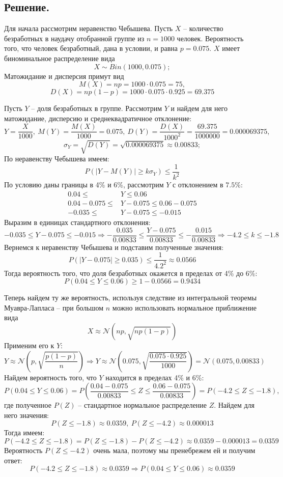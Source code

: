 \documentclass[a4paper, 12pt]{article}
\begin{document}
    \subsection{Решение.}
    Для начала рассмотрим неравенство Чебышева. Пусть $X$ -- количество безработных в наудачу отобранной
    группе из $n=1000$ человек. Вероятность того, что человек безработный, дана в условии, и равна $p=0.075$.
    $X$ имеет биноминальное распределение вида
    $$
    X\sim Bin(1000, 0.075);
    $$
    Матожидание и дисперсия примут вид
    $$
    M(X)=np=1000\cdot0.075=75,
    $$
    $$
    D(X)=np(1-p)=1000\cdot0.075\cdot0.925=69.375
    $$


    Пусть $Y$ -- доля безработных в группе. Рассмотрим $Y$ и найдем для него матожидание, дисперсию и
    среднеквадратичное отклонение:
    $$
    Y=\dfrac{X}{1000},\ M(Y)=\dfrac{M(X)}{1000}=0.075,\ D(Y)=\dfrac{D(X)}{1000^2}=\dfrac{69.375}{1000000}=0.000069375,
    $$
    $$
    \sigma_{Y}=\sqrt{D(Y)}=\sqrt{0.000069375}\approx 0.00833;
    $$
    По неравенству Чебышева имеем:
    $$
    P(|Y-M(Y)|\geq k\sigma_{Y})\leq \dfrac{1}{k^2}
    $$
    По условию даны границы в 4\% и 6\%, рассмотрим $Y$ с отклонением в $7.5\%$:
    \begin{align*}
    0.04\leq& Y\leq 0.06\\
    0.04-0.075\leq& Y-0.075\leq 0.06-0.075\\
    -0.035\leq& Y-0.075\leq -0.015
    \end{align*}
    Выразим в единицах стандартного отклонения:
    $$
    -0.035\leq Y-0.075\leq -0.015\Rightarrow -\dfrac{0.035}{0.00833}\leq \dfrac{Y-0.075}{0.00833}\leq -\dfrac{0.015}{0.00833}\Rightarrow
    -4.2\leq k \leq -1.8
    $$
    Вернемся к неравенству Чебышева и подставим полученные значения:
    $$
    P(|Y-0.075|\geq 0.035)\leq \dfrac{1}{4.2^2}\approx 0.0566
    $$
    Тогда вероятность того, что доля безработных окажется в пределах от 4\% до 6\%:
    $$
    P(0.04\leq Y\leq 0.06)\geq 1-0.0566=0.9434
    $$


    Теперь найдем ту же вероятность, используя следствие из интегральной теоремы\\ Муавра-Лапласа --
    при большом $n$ можно использовать нормальное приближение вида
    $$
    X\approx\mathcal{N}\left(np,\sqrt{np(1-p)}\right)
    $$
    Применим его к $Y$:
    $$
    Y\approx \mathcal{N}\left(p,\sqrt{\dfrac{p(1-p)}{n}}\right)
    \Rightarrow Y\approx \mathcal{N}\left(0.075,\sqrt{\dfrac{0.075\cdot0.925}{1000}}\right)=\mathcal{N}(0.075,0.00833)
    $$
    Найдем вероятность того, что $Y$ находится в пределах 4\% и 6\%:
    $$
    P(0.04\leq Y\leq 0.06)=P\left(\dfrac{0.04-0.075}{0.00833}\leq Z \leq \dfrac{0.06-0.075}{0.00833}\right)
    =P(-4.2\leq Z\leq -1.8),
    $$
    где полученное $P(Z)$ -- стандартное нормальное распределение $Z$.
    Найдем для него значения:
    $$
    P(Z\leq -1.8)\approx 0.0359,\ P(Z\leq -4.2)\approx 0.000013
    $$
    Тогда имеем:
    $$
    P(-4.2 \leq Z \leq -1.8) = P(Z \leq -1.8) - P(Z \leq -4.2) \approx 0.0359 - 0.000013 = 0.0359
    $$
    Вероятность $P(Z\leq -4.2)$ очень мала, поэтому мы пренебрежем ей и получим
    ответ:
    $$
    P(-4.2\leq Z \leq -1.8)\approx0.0359\Rightarrow P(0.04\leq Y \leq 0.06)\approx0.0359
    $$
\end{document}
